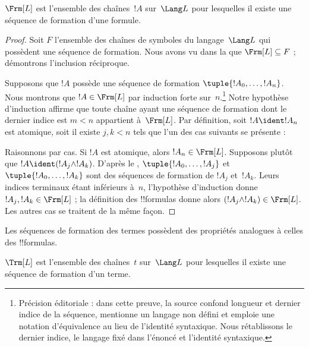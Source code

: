\documentclass[../../../include/open-logic-section]{subfiles}
\begin{document}
\begin{thm}
$\Frm[L]$ est l'ensemble des chaînes~$!A$ sur~$\Lang L$ pour
lesquelles il existe une séquence de formation d'une formule.
\end{thm}

\begin{proof}
Soit $F$ l'ensemble des chaînes de symboles du langage~$\Lang L$
qui possèdent une séquence de formation. Nous avons vu dans la
 que $\Frm[L] \subseteq F$ ;
démontrons l'inclusion réciproque.

Supposons que $!A$ possède une séquence de formation
$\tuple{!A_0,\dotsc,!A_n}$. Nous montrons que $!A \in \Frm[L]$
par induction forte sur~$n$.\footnote{Précision éditoriale : dans cette preuve, la source confond longueur et dernier indice de la séquence, mentionne un langage non défini et emploie une notation d'équivalence au lieu de l'identité syntaxique. Nous rétablissons le dernier indice, le langage fixé dans l'énoncé et l'identité syntaxique.} Notre hypothèse d'induction affirme
que toute chaîne ayant une séquence de formation dont le dernier
indice est $m < n$ appartient à~$\Frm[L]$.
Par définition, soit $!A \ident !A_n$ est atomique, soit il existe
$j,k < n$ tels que l'un des cas suivants se présente :
\begin{enumerate}
\end{enumerate}
Raisonnons par cas. Si $!A$ est atomique, alors
$!A_n \in \Frm[L]$. Supposons plutôt que
$!A \ident (!A_j \land !A_k)$. D'après le
,
$\tuple{!A_0,\dotsc,!A_j}$ et $\tuple{!A_0,\dotsc,!A_k}$
sont des séquences de formation de $!A_j$ et~$!A_k$. Leurs indices
terminaux étant inférieurs à~$n$, l'hypothèse d'induction donne
$!A_j,!A_k \in \Frm[L]$ ; la définition des !!{formula}s donne
alors $(!A_j \land !A_k) \in \Frm[L]$. Les autres cas se traitent
de la même façon.
\end{proof}

Les séquences de formation des termes possèdent des propriétés
analogues à celles des !!{formula}s.

\begin{prop}
$\Trm[L]$ est l'ensemble des chaînes~$t$ sur~$\Lang L$ pour
lesquelles il existe une séquence de formation d'un terme.
\end{prop}
\end{document}

